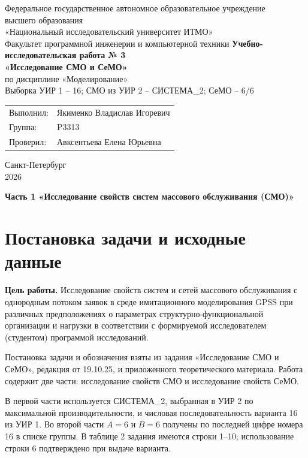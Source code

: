 \documentclass[12pt,a4paper]{article}
\begin{document}
\begin{titlepage}\centering
Федеральное государственное автономное образовательное учреждение\\
высшего образования\\
«Национальный исследовательский университет ИТМО»\\[5mm]
Факультет программной инженерии и компьютерной техники
\vfill
{\large\bfseries Учебно-исследовательская работа № 3}\\[5mm]
{\large\bfseries «Исследование СМО и СеМО»}\\[5mm]
по дисциплине «Моделирование»\\[3mm]
Выборка УИР 1 -- 16; СМО из УИР 2 -- СИСТЕМА\_2; СеМО -- 6/6
\vfill
\begin{flushright}\begin{tabular}{ll}
Выполнил: & Якименко Владислав Игоревич\\
Группа: & P3313\\
Проверил: & Авксентьева Елена Юрьевна
\end{tabular}\end{flushright}
\vfill Санкт-Петербург\\2026
\end{titlepage}
\setcounter{page}{2}
\begin{center}\textbf{Часть 1 «Исследование свойств систем массового обслуживания (СМО)»}\end{center}
\section{Постановка задачи и исходные данные}
\noindent\textbf{Цель работы.} Исследование свойств систем и сетей массового обслуживания с однородным потоком заявок в среде имитационного моделирования GPSS при различных предположениях о параметрах структурно-функциональной организации и нагрузки в соответствии с формируемой исследователем (студентом) программой исследований.

Постановка задачи и обозначения взяты из задания «Исследование СМО и СеМО», редакция от 19.10.25, и приложенного теоретического материала. Работа содержит две части: исследование свойств СМО и исследование свойств СеМО.

В первой части используется СИСТЕМА\_2, выбранная в УИР 2 по максимальной производительности, и числовая последовательность варианта 16 из УИР 1. Во второй части \(A=6\) и \(B=6\) получены по последней цифре номера 16 в списке группы. В таблице 2 задания имеются строки 1--10; использование строки 6 подтверждено при выдаче варианта.
\end{document}
